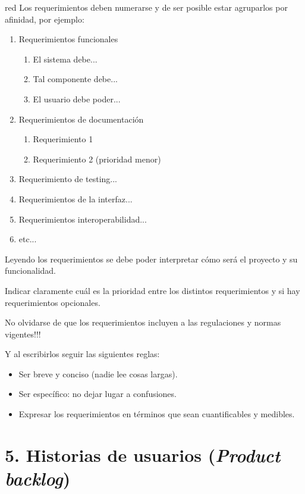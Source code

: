 \documentclass[
11pt, %
]{charter}
\begin{document}
\begin{consigna}{red}
Los requerimientos deben numerarse y de ser posible estar agruparlos por afinidad, por ejemplo:

\begin{enumerate}
	\item Requerimientos funcionales
		\begin{enumerate}
			\item El sistema debe...
			\item Tal componente debe...
			\item El usuario debe poder...
		\end{enumerate}
	\item Requerimientos de documentación
		\begin{enumerate}
			\item Requerimiento 1
			\item Requerimiento 2 (prioridad menor)
		\end{enumerate}
	\item Requerimiento de testing...
	\item Requerimientos de la interfaz...
	\item Requerimientos interoperabilidad...
	\item etc...
\end{enumerate}

Leyendo los requerimientos se debe poder interpretar cómo será el proyecto y su funcionalidad.

Indicar claramente cuál es la prioridad entre los distintos requerimientos y si hay requerimientos opcionales. 

No olvidarse de que los requerimientos incluyen a las regulaciones y normas vigentes!!!

Y al escribirlos seguir las siguientes reglas:
\begin{itemize}
	\item Ser breve y conciso (nadie lee cosas largas). 
	\item Ser específico: no dejar lugar a confusiones.
	\item Expresar los requerimientos en términos que sean cuantificables y medibles.
\end{itemize}

\end{consigna}

\section{5. Historias de usuarios (\textit{Product backlog})}
\label{sec:backlog}
\end{document}
